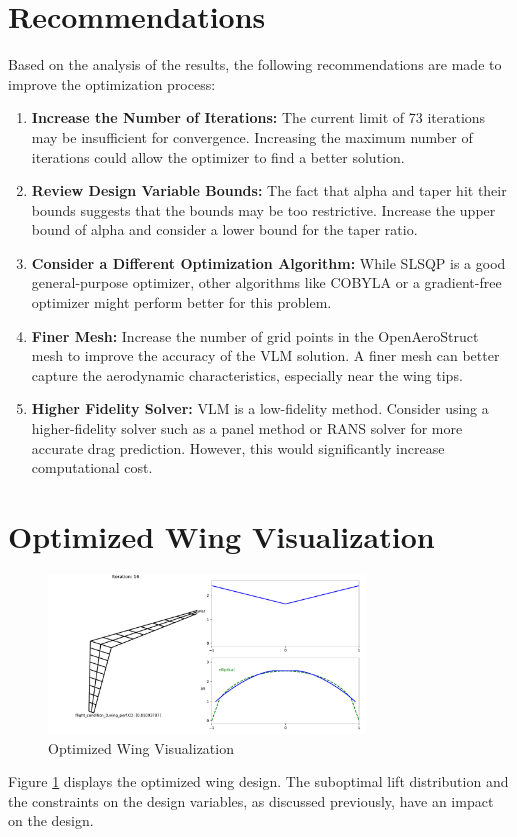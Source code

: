 \documentclass{article}
\begin{document}
\section{Recommendations}
Based on the analysis of the results, the following recommendations are made to improve the optimization process:

\begin{enumerate}
    \item \textbf{Increase the Number of Iterations:} The current limit of 73 iterations may be insufficient for convergence. Increasing the maximum number of iterations could allow the optimizer to find a better solution.
    \item \textbf{Review Design Variable Bounds:} The fact that alpha and taper hit their bounds suggests that the bounds may be too restrictive. Increase the upper bound of alpha and consider a lower bound for the taper ratio.
    \item \textbf{Consider a Different Optimization Algorithm:} While SLSQP is a good general-purpose optimizer, other algorithms like COBYLA or a gradient-free optimizer might perform better for this problem.
    \item \textbf{Finer Mesh:} Increase the number of grid points in the OpenAeroStruct mesh to improve the accuracy of the VLM solution. A finer mesh can better capture the aerodynamic characteristics, especially near the wing tips.
    \item \textbf{Higher Fidelity Solver:} VLM is a low-fidelity method. Consider using a higher-fidelity solver such as a panel method or RANS solver for more accurate drag prediction. However, this would significantly increase computational cost.
\end{enumerate}

\section{Optimized Wing Visualization}
\begin{figure}[h!]
    \centering
    \includegraphics[width=0.75\textwidth]{./Optimized_Wing.pdf}
    \caption{Optimized Wing Visualization}
    \label{fig:optimized_wing}
\end{figure}
Figure \ref{fig:optimized_wing} displays the optimized wing design. The suboptimal lift distribution and the constraints on the design variables, as discussed previously, have an impact on the design.
\end{document}
